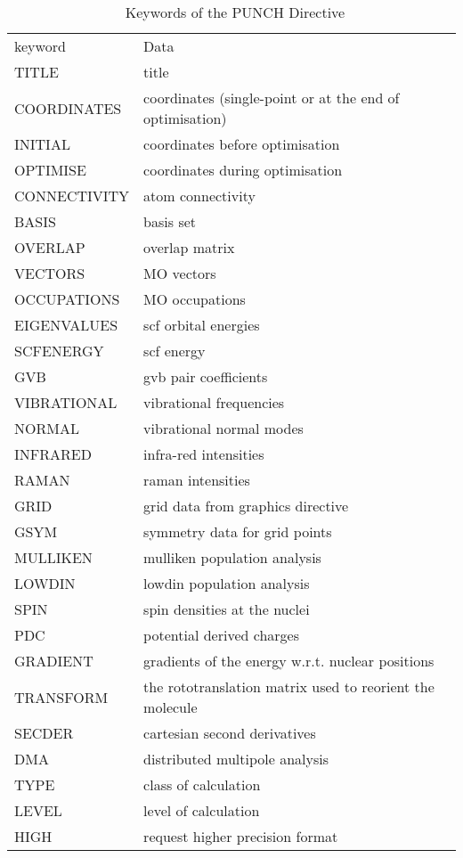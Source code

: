 \documentclass[11pt,fleqn]{article}
\begin{document}
\begin{table}
 \caption{\label{table:1}\  Keywords of the PUNCH Directive}
 
 \begin{centering}
 \begin{tabular}{llr}
\\ \hline\hline
  keyword         &     Data &   \\ \cline{1-3}
    TITLE       & title   & \\
    COORDINATES & coordinates (single-point or at the end of optimisation)  & \\
    INITIAL     & coordinates before optimisation  & \\
    OPTIMISE    & coordinates during optimisation   & \\
    CONNECTIVITY & atom connectivity   & \\
    BASIS       & basis set  & \\
    OVERLAP     & overlap matrix  & \\
    VECTORS     & MO vectors   & \\
    OCCUPATIONS & MO occupations   & \\
    EIGENVALUES & scf orbital energies   & \\
    SCFENERGY   & scf energy   & \\
    GVB         & gvb pair coefficients   & \\
    VIBRATIONAL & vibrational frequencies   & \\
    NORMAL      & vibrational normal modes   & \\
    INFRARED    & infra-red intensities & \\
    RAMAN       & raman intensities & \\
    GRID        & grid data from graphics directive   & \\
    GSYM        & symmetry data for grid points & \\ 
    MULLIKEN    & mulliken population analysis   & \\
    LOWDIN      & lowdin population analysis   & \\
    SPIN        & spin densities at the nuclei & \\
    PDC         & potential derived charges & \\
    GRADIENT    & gradients of the energy w.r.t. nuclear positions   & \\
    TRANSFORM   & the rototranslation matrix used to reorient the molecule   & \\
    SECDER      & cartesian second derivatives & \\
    DMA         & distributed multipole analysis & \\
    TYPE        & class of calculation   & \\
    LEVEL       & level of calculation   & \\
    HIGH        & request higher precision format & \\
\hline\hline
 \end{tabular}
 
 \end{centering}
\end{table}
\end{document}
